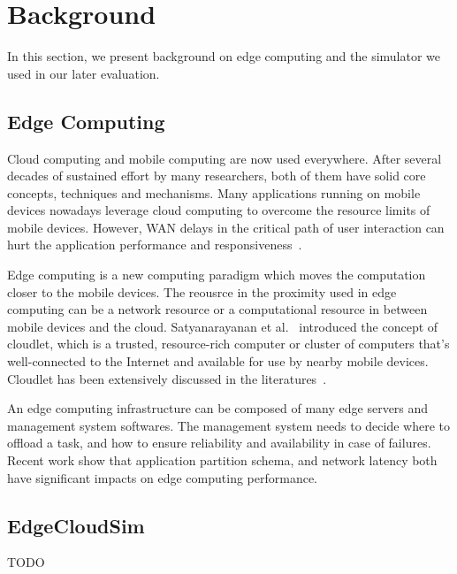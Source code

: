 \section{Background}
\label{sec:background}

In this section, we present background on edge computing and the simulator
we used in our later evaluation.

\subsection{Edge Computing}
Cloud computing and mobile computing are now used everywhere.
After several decades of sustained effort by many researchers, both of them have
solid core concepts, techniques and mechanisms. Many applications running on mobile devices nowadays
leverage cloud computing to overcome the resource limits of mobile devices. However,
WAN delays in the critical path of user interaction can hurt the application
performance and responsiveness~\cite{cloudlets09}.

Edge computing is a new computing paradigm which moves the computation closer to the mobile devices.
The reousrce in the proximity used in edge computing can be a network resource or a computational resource
in between mobile devices and the cloud. Satyanarayanan et al.~\cite{cloudlets09} introduced the concept
of cloudlet, which is a trusted, resource-rich computer or cluster of computers that's well-connected to
the Internet and available for use by nearby mobile devices. Cloudlet has been extensively discussed in the
literatures~\cite{edge-computing, Cloudlets12,hu-apsys16,ChaufournierSLN17}.

An edge computing infrastructure can be composed of many edge servers and management system softwares.
The management system needs to decide where to offload a task, and how to ensure reliability and availability
in case of failures. Recent work \cite{hu-apsys16,COMET} show that application partition schema, and network latency
both have significant impacts on edge computing performance.

\subsection{EdgeCloudSim}
TODO
